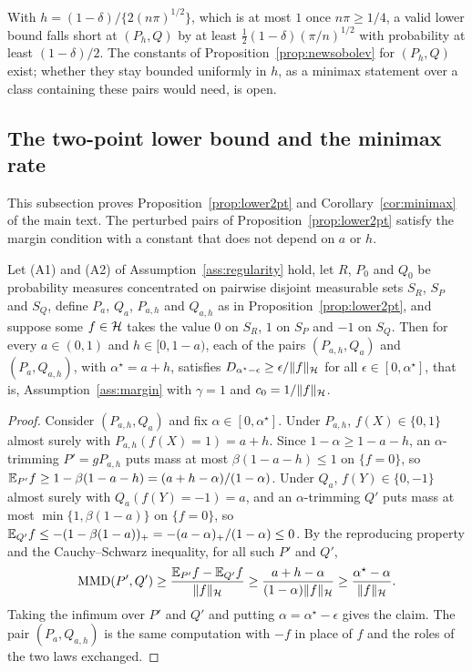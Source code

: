 With $h=(1-\delta)/\{2(n\pi)^{1/2}\}$, which is at most $1$ once $n\pi\ge1/4$, a valid lower bound falls short at $(P_h,Q)$
by at least $\tfrac12(1-\delta)(\pi/n)^{1/2}$ with probability at least $(1-\delta)/2$. The constants of
Proposition~\ref{prop:newsobolev} for $(P_h,Q)$ exist; whether they stay bounded uniformly in $h$, as a minimax
statement over a class containing these pairs would need, is open.

\subsection{The two-point lower bound and the minimax rate}
\label{sec:optproofs}

This subsection proves Proposition~\ref{prop:lower2pt} and Corollary~\ref{cor:minimax} of the main text. The
perturbed pairs of Proposition~\ref{prop:lower2pt} satisfy the margin condition with a constant that does not depend on
$a$ or $h$.

\begin{lemma}
\label{lem:twopointmargin}
Let (A1) and (A2) of Assumption~\ref{ass:regularity} hold, let $R$, $P_0$ and $Q_0$ be probability measures
concentrated on pairwise disjoint measurable sets $S_R$, $S_P$ and $S_Q$, define $P_a$, $Q_a$, $P_{a,h}$ and $Q_{a,h}$
as in Proposition~\ref{prop:lower2pt}, and suppose some $f\in\mathcal{H}$ takes the value $0$ on $S_R$, $1$ on $S_P$ and $-1$
on $S_Q$. Then for every $a\in(0,1)$ and $h\in[0,1-a)$, each of the pairs $(P_{a,h},Q_a)$ and $(P_a,Q_{a,h})$, with
$\alpha^\star=a+h$, satisfies $D_{\alpha^\star-\epsilon}\ge\epsilon/\|f\|_{\mathcal{H}}$ for all $\epsilon\in[0,\alpha^\star]$,
that is, Assumption~\ref{ass:margin} with $\gamma=1$ and $c_0=1/\|f\|_{\mathcal{H}}$.
\end{lemma}

\begin{proof}
Consider $(P_{a,h},Q_a)$ and fix $\alpha\in[0,\alpha^\star]$. Under $P_{a,h}$, $f(X)\in\{0,1\}$ almost surely with
$P_{a,h}(f(X)=1)=a+h$. Since $1-\alpha\ge1-a-h$, an $\alpha$-trimming $P'=gP_{a,h}$ puts mass at most
$\beta(1-a-h)\le1$ on $\{f=0\}$, so $\mathbb{E}_{P'}f\ge1-\beta(1-a-h)=(a+h-\alpha)/(1-\alpha)$. Under $Q_a$,
$f(Y)\in\{0,-1\}$ almost surely with $Q_a(f(Y)=-1)=a$, and an $\alpha$-trimming $Q'$ puts mass at most
$\min\{1,\beta(1-a)\}$ on $\{f=0\}$, so $\mathbb{E}_{Q'}f\le-(1-\beta(1-a))_+=-(a-\alpha)_+/(1-\alpha)\le0$. By the reproducing
property and the Cauchy--Schwarz inequality, for all such $P'$ and $Q'$,
\[
\operatorname{MMD}(P',Q')\ge\frac{\mathbb{E}_{P'}f-\mathbb{E}_{Q'}f}{\|f\|_{\mathcal{H}}}\ge\frac{a+h-\alpha}{(1-\alpha)\|f\|_{\mathcal{H}}}\ge\frac{\alpha^\star-\alpha}{\|f\|_{\mathcal{H}}} .
\]
Taking the infimum over $P'$ and $Q'$ and putting $\alpha=\alpha^\star-\epsilon$ gives the claim. The pair
$(P_a,Q_{a,h})$ is the same computation with $-f$ in place of $f$ and the roles of the two laws exchanged.
\end{proof}

